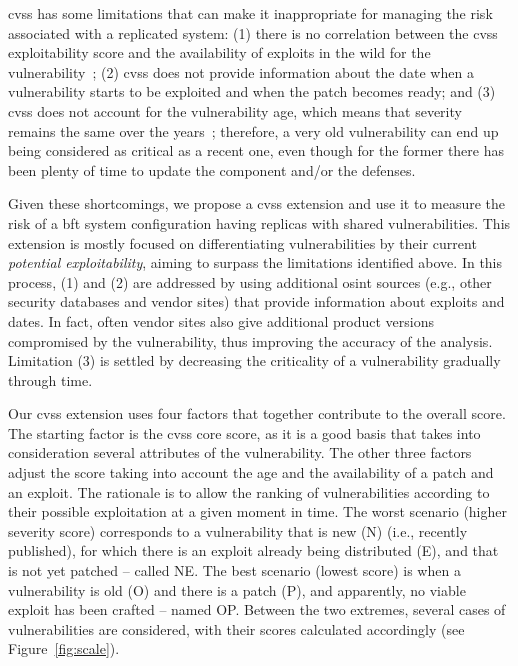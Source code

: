 \gls{cvss} has some limitations that can make it inappropriate for managing the risk associated with a replicated system:
(1) there is no correlation between the \gls{cvss} exploitability score and the availability of exploits in the wild for the vulnerability~\cite{Bozorgi:2010}; 
(2) \gls{cvss} does not provide information about the date when a vulnerability starts to be exploited and when the patch becomes ready; 
and (3) \gls{cvss} does not account for the vulnerability age, which means that severity remains the same over the years~\cite{Frei:2006}; 
therefore, a very old vulnerability can end up being considered as critical as a recent one, even though for the former there has been plenty of time to update the component and/or the defenses.  


Given these shortcomings, we propose a \gls{cvss} extension and use it to measure the risk of a \gls{bft} system configuration having replicas with shared vulnerabilities.
This extension is mostly focused on differentiating vulnerabilities by their current \emph{potential exploitability}, aiming to surpass the limitations identified above.
In this process, (1) and (2) are addressed by using additional \gls{osint} sources (e.g., other security databases and vendor sites) that provide information about exploits and dates. 
In fact, often vendor sites also give additional product versions compromised by the vulnerability, thus improving the accuracy of the analysis. 
Limitation (3) is settled by decreasing the criticality of a vulnerability gradually through time.

Our \gls{cvss} extension uses four factors that together contribute to the overall score. 
The starting factor is the \gls{cvss} core score, as it is a good basis that takes into consideration several attributes of the vulnerability.
The other three factors adjust the score taking into account the age and the availability of a patch and an exploit. 
The rationale is to allow the ranking of vulnerabilities according to their possible exploitation at a given moment in time.
The worst scenario (higher severity score) corresponds to a vulnerability that is new (N) (i.e., recently published), for which there is an exploit already being distributed (E), and that is not yet patched -- called NE.
The best scenario (lowest score) is when a vulnerability is old (O) and there is a patch (P), and apparently, no viable exploit has been crafted -- named OP. 
Between the two extremes, several cases of vulnerabilities are considered, with their scores calculated accordingly (see Figure~\ref{fig:scale}).



